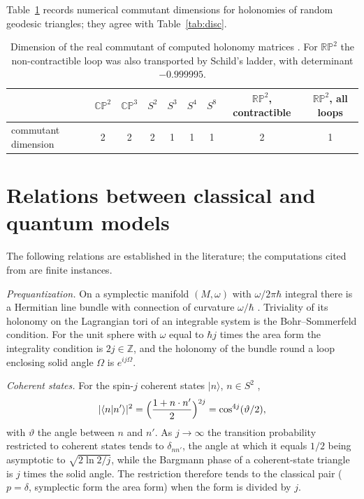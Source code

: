 Table~\ref{tab:comm} records numerical commutant dimensions for holonomies of random geodesic triangles; they agree with Table~\ref{tab:disc}.

\begin{table}[ht]\centering\small
\begin{tabular}{@{}lcccccccc@{}}\toprule
 & $\mathbb{CP}^2$ & $\mathbb{CP}^3$ & $S^2$ & $S^3$ & $S^4$ & $S^8$ & $\mathbb{RP}^2$, contractible & $\mathbb{RP}^2$, all loops\\\midrule
commutant dimension & 2 & 2 & 2 & 1 & 1 & 1 & 2 & 1\\\bottomrule
\end{tabular}
\caption{Dimension of the real commutant of computed holonomy matrices \cite{comp}. For $\mathbb{RP}^2$ the non-contractible loop was also transported by Schild's ladder, with determinant $-0.999995$.}\label{tab:comm}
\end{table}

\section{Relations between classical and quantum models}\label{sec:cq}

The following relations are established in the literature; the computations cited from \cite{comp} are finite instances.

\emph{Prequantization.} On a symplectic manifold $(M,\omega)$ with $\omega/2\pi\hbar$ integral there is a Hermitian line bundle with connection of curvature $\omega/\hbar$ \cite{kostant,souriau}. Triviality of its holonomy on the Lagrangian tori of an integrable system is the Bohr--Sommerfeld condition. For the unit sphere with $\omega$ equal to $\hbar j$ times the area form the integrality condition is $2j\in\mathbb{Z}$, and the holonomy of the bundle round a loop enclosing solid angle $\Omega$ is $e^{ij\Omega}$.

\emph{Coherent states.} For the spin-$j$ coherent states $|n\rangle$, $n\in S^2$ \cite{perelomov},
\begin{equation}\label{eq:coh}
|\langle n|n'\rangle|^2=\Bigl(\frac{1+n\cdot n'}{2}\Bigr)^{2j}=\cos^{4j}(\vartheta/2),
\end{equation}
with $\vartheta$ the angle between $n$ and $n'$. As $j\to\infty$ the transition probability restricted to coherent states tends to $\delta_{nn'}$, the angle at which it equals $1/2$ being asymptotic to $\sqrt{2\ln2/j}$, while the Bargmann phase of a coherent-state triangle is $j$ times the solid angle. The restriction therefore tends to the classical pair ($p=\delta$, symplectic form the area form) when the form is divided by $j$.

